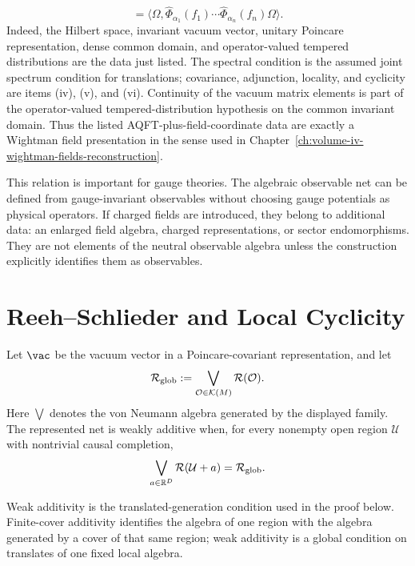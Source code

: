 \begin{remark}
\[  =
  \langle\Omega,
  \widehat\Phi_{\alpha_1}(f_1)\cdots
  \widehat\Phi_{\alpha_n}(f_n)\Omega\rangle .
\]
Indeed, the Hilbert space, invariant vacuum vector, unitary Poincare
representation, dense common domain, and operator-valued tempered
distributions are the data just listed.  The spectral condition is the assumed
joint spectrum condition for translations; covariance, adjunction, locality,
and cyclicity are items (iv), (v), and (vi).  Continuity of the vacuum matrix
elements is part of the operator-valued tempered-distribution hypothesis on
the common invariant domain.  Thus the listed AQFT-plus-field-coordinate data
are exactly a Wightman field presentation in the sense used in
Chapter~\ref{ch:volume-iv-wightman-fields-reconstruction}.
\end{remark}

This relation is important for gauge theories.  The algebraic observable net
can be defined from gauge-invariant observables without choosing gauge
potentials as physical operators.  If charged fields are introduced, they
belong to additional data: an enlarged field algebra, charged
representations, or sector endomorphisms.  They are not elements of the
neutral observable algebra unless the construction explicitly identifies them
as observables.

\section{Reeh--Schlieder and Local Cyclicity}

\begin{definition}
\label{def:weak-additivity-vacuum-net}
Let \(\vac\) be the vacuum vector in a Poincare-covariant representation, and
let
\[
  \mathcal R_{\rm glob}
  :=
  \bigvee_{\mathcal O\in\mathcal K(M)}\mathcal R(\mathcal O).
\]
Here \(\bigvee\) denotes the von Neumann algebra generated by the displayed
family.  The represented net is weakly additive when, for every nonempty open
region \(\mathcal U\) with nontrivial causal completion,
\[
  \bigvee_{a\in\mathbb R^D}\mathcal R(\mathcal U+a)
  =
  \mathcal R_{\rm glob}.
\]
\end{definition}

Weak additivity is the translated-generation condition used in the proof
below.  Finite-cover additivity identifies the algebra of one region with the
algebra generated by a cover of that same region; weak additivity is a global
condition on translates of one fixed local algebra.

